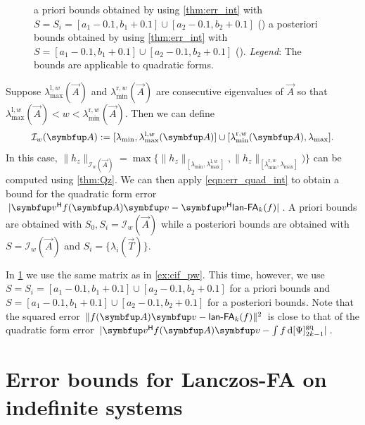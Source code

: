 \begin{figure}[ht]
{    a priori bounds obtained by using \cref{thm:err_int} with \( S = S_i = [a_1-0.1,b_1+0.1]\cup[a_2-0.1,b_2+0.1]  \)
    ({\protect{}})
    a posteriori bounds obtained by using \cref{thm:err_int} with \( S = [a_1-0.1,b_1+0.1]\cup[a_2-0.1,b_2+0.1] \)
    ({\protect{}}). 
    \hspace{.25em}\emph{Legend}: The bounds are applicable to quadratic forms.
    }
    \label{fig:ch7_pcr_qf}
\end{figure}



Suppose \( \lambda_{\text{max}}^{\text{l},w}(\vec{A}) \) and \( \lambda_{\text{min}}^{\text{r},w}(\vec{A}) \) are consecutive eigenvalues of \( \vec{A} \) so that  \( \lambda_{\text{max}}^{\text{l},w}(\vec{A}) < w < \lambda_{\text{min}}^{\text{r},w}(\vec{A}) \).
Then we can define
\begin{equation*}
\mathcal{I}_w(\vec{A}) := [ \lmin , \lambda_{\text{max}}^{\text{l},w}(\vec{A}) ] \cup [ \lambda_{\text{min}}^{\text{r},w}(\vec{A}) , \lmax ].
\end{equation*}
In this case, \( \|h_{z}\|_{\mathcal{I}_w(\vec{A})} = \max\{ \|h_{z}\|_{ [\lambda_{\text{min}},\lambda_{\text{max}}^{\text{l},w} ] }, \|h_{z}\|_{ [\lambda_{\text{min}}^{\text{r},w},\lambda_{\text{max}} ] }) \} \) can be computed using \cref{thm:Qz}. 
We can then apply \cref{eqn:err_quad_int} to obtain a bound for the quadratic form error $| \vec{v}^\cT \fA\vec{v} - \vec{v}^\cT \lan_k(f)|$.
A priori bounds are obtained with $S_0, S_i = \mathcal{I}_w(\vec A)$ while a posteriori bounds are obtained with $S = \mathcal{I}_w(\vec A)$ and $S_i = \{ \lambda_i(\vec{T}) \}$.

In \cref{fig:ch7_pcr_qf} we use the same matrix as in \cref{ex:cif_pw}.
This time, however, we use \( S = S_i = [a_1-0.1,b_1+0.1]\cup[a_2-0.1,b_2+0.1]  \) for a priori bounds and \( S = [a_1-0.1,b_1+0.1]\cup[a_2-0.1,b_2+0.1]  \) for a posteriori bounds.
Note that the squared error \( \| \fA\vec{v} - \lan_k(f) \|^2 \) is close to that of the quadratic form error \( | \vec{v}^\cT \fA\vec{v} - \int f \,\d\qq[g]{\Psi}{2k-1} | \).

\section{Error bounds for Lanczos-FA on indefinite systems}
\label{sec:CG_indefinite}

